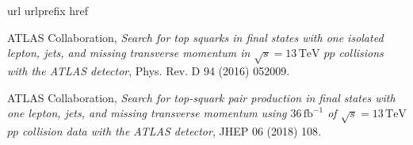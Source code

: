 \vspace{0.5cm}
\begin{thebibliography}{10}
\makeatletter
\renewcommand\@biblabel[1]{}
\makeatother
\expandafter\ifx\csname url\endcsname\relax
  \def\url#1{\texttt{#1}}\fi
\expandafter\ifx\csname urlprefix\endcsname\relax\def\urlprefix{URL }\fi
\expandafter\ifx\csname href\endcsname\relax
  \def\href#1#2{#2} \def\path#1{#1}\fi
  
{ATLAS Collaboration}, {\em Search for top squarks in final states with one
  isolated lepton, jets, and missing transverse momentum in \(\sqrt{s} =
  13\,\text{TeV}\) \(pp\) collisions with the ATLAS detector},
  {Phys. Rev. D 94 (2016) 052009}.


{ATLAS Collaboration}, {\em Search for top-squark pair production in final states
  with one lepton, jets, and missing transverse momentum using
  \(36\,\text{fb}^{-1}\) of \(\sqrt{s} = 13\,\text{TeV}\) \(pp\) collision data
  with the ATLAS detector}, 
  {JHEP 06 (2018) 108}.
  
\end{thebibliography}

